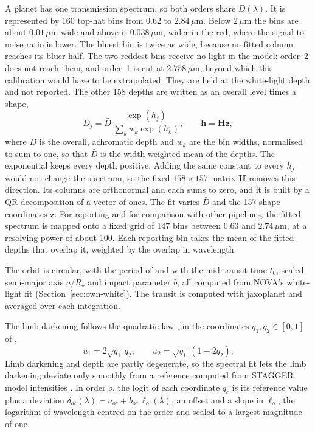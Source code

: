 A planet has one transmission spectrum, so both orders share $D(\lambda)$. It
is represented by 160 top-hat bins from 0.62 to $2.84\,\mu\mathrm{m}$. Below
$2\,\mu\mathrm{m}$ the bins are about $0.01\,\mu\mathrm{m}$ wide and above it
$0.038\,\mu\mathrm{m}$, wider in the red, where the signal-to-noise ratio is
lower. The bluest bin is twice as wide, because no fitted column reaches its
bluer half. The two reddest bins receive no light in the model: order~2 does
not reach them, and order~1 is cut at $2.758\,\mu\mathrm{m}$, beyond which
this calibration would have to be extrapolated. They are held at
the white-light depth and not reported. The other 158 depths are written as an
overall level times a shape,
\begin{equation}
  D_j = \bar D\,
  \frac{\exp(h_j)}{\sum_{k} w_k \exp(h_k)}, \qquad \bm{h}=\bm{H}\bm{z},
  \label{eq:depth-basis}
\end{equation}
where $\bar D$ is the overall, achromatic depth and $w_k$ are the bin widths,
normalised to sum to one, so that $\bar D$ is the width-weighted mean of the
depths. The exponential keeps every depth positive. Adding the same constant to
every $h_j$ would not change the spectrum, so the fixed $158\times157$ matrix
$\bm{H}$ removes this direction. Its columns are orthonormal and each sums to
zero, and it is built by a QR decomposition of a vector of ones. The fit
varies $\bar D$ and the 157 shape coordinates $\bm{z}$. For reporting and for
comparison with other pipelines, the fitted spectrum is mapped onto a fixed
grid of 147 bins between 0.63 and $2.74\,\mu\mathrm{m}$, at a resolving power
of about 100. Each reporting bin takes the mean of the fitted depths that
overlap it, weighted by the overlap in wavelength.

The orbit is circular, with the period of \citet{LouieEtAl2025} and with the
mid-transit time $t_0$, scaled semi-major axis $a/R_\star$ and impact
parameter $b$, all computed from NOVA's white-light fit
(Section~\ref{sec:own-white}). The
transit is computed with jaxoplanet \citep{Jaxoplanet2025} and averaged over
each integration.

The limb darkening follows the quadratic law \citep{MandelAgol2002}, in the
coordinates $q_1,q_2\in[0,1]$ of \citet{Kipping2013},
\begin{equation}
 u_1=2\sqrt{q_1}\,q_2, \qquad
 u_2=\sqrt{q_1}\,(1-2q_2).
 \label{eq:kipping-coordinates}
\end{equation}
Limb darkening and depth are partly degenerate, so the spectral fit lets the
limb darkening deviate only smoothly from a reference computed from STAGGER
model intensities \citep{MagicEtAl2015}. In order $o$, the logit of each
coordinate $q_c$ is its reference value plus a deviation
$\delta_{oc}(\lambda)=a_{oc}+b_{oc}\,\ell_o(\lambda)$, an offset and a slope in
$\ell_o$, the logarithm of wavelength centred on the order and scaled to a
largest magnitude of one.


